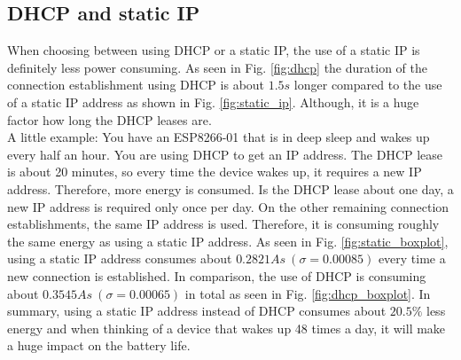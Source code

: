 \subsection{DHCP and static IP}
When choosing between using DHCP or a static IP, the use of a static IP is definitely less power consuming.
As seen in Fig. \ref{fig:dhcp} the duration of the connection establishment using DHCP is about $1.5 s$ longer compared to the use of a static IP address as shown in Fig. \ref{fig:static_ip}.
Although, it is a huge factor how long the DHCP leases are.\\
A little example: You have an ESP8266-01 that is in deep sleep and wakes up every half an hour. You are using DHCP to get an IP address.
The DHCP lease is about 20 minutes, so every time the device wakes up, it requires a new IP address. Therefore, more energy is consumed.
Is the DHCP lease about one day, a new IP address is required only once per day. On the other remaining connection establishments, the same IP address is used. Therefore, it is consuming roughly the same energy as using a static IP address.
As seen in Fig. \ref{fig:static_boxplot}, using a static IP address consumes about $0.2821 As\ (\sigma = 0.00085)$ every time a new connection is established.
In comparison, the use of DHCP is consuming about $0.3545 As\ (\sigma = 0.00065)$ in total as seen in Fig. \ref{fig:dhcp_boxplot}.
In summary, using a static IP address instead of DHCP consumes about $20.5\%$ less energy and when thinking of a device that wakes up 48 times a day, it will make a huge impact on the battery life.